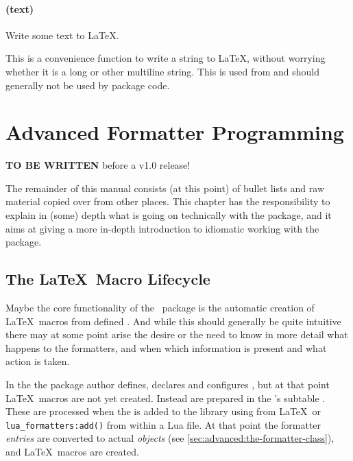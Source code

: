\documentclass[12pt]{scrartcl}
\begin{document}
\paragraph{ (text)}

Write some text to \LaTeX.

This is a convenience function to write a string to \LaTeX, without worrying
whether it is a long or other multiline string.  This is used from
 and should generally not be used by package code.


\section{Advanced Formatter Programming}
\label{sec:advanced-programming}

\textbf{TO BE WRITTEN} before a v1.0 release!

The remainder of this manual consists (at this point) of bullet lists and raw material copied over from other places. This chapter has the responsibility to explain in (some) depth what is going on technically with the package, and it aims at giving a more in-depth introduction to idiomatic working with the package.



\subsection{The \LaTeX\ Macro Lifecycle}
\label{sec:latex-macro-lifecycle}

Maybe the core functionality of the \luaformatters\ package is the
automatic creation of \LaTeX\ macros from defined .
And while this should generally be quite intuitive there may at some point arise
the desire or the need to know in more detail what happens to the formatters,
and when which information is present and what action is taken.

In the  the package author defines, declares and
configures , but at that point \LaTeX\ macros are
not yet created. Instead  are prepared
in the 's subtable .  These are
processed when the  is added to the library using
 from \LaTeX\ or \texttt{lua_formatters:add()} from
within a Lua file.  At that point the formatter \emph{entries} are converted to
actual  \emph{objects} (see
\vref{sec:advanced:the-formatter-class}), and \LaTeX\ macros are created.
\end{document}
